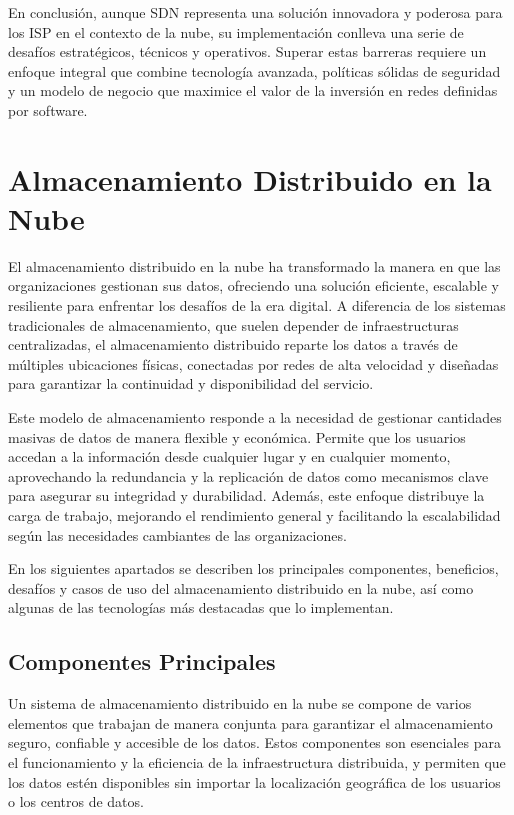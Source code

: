 {                En conclusión, aunque SDN representa una solución innovadora y poderosa para los ISP en el contexto de la nube, su implementación conlleva una serie de desafíos estratégicos, técnicos y operativos. Superar estas barreras requiere un enfoque integral que combine tecnología avanzada, políticas sólidas de seguridad y un modelo de negocio que maximice el valor de la inversión en redes definidas por software.
    
    \section{Almacenamiento Distribuido en la Nube}
    
        El almacenamiento distribuido en la nube ha transformado la manera en que las organizaciones gestionan sus datos, ofreciendo una solución eficiente, escalable y resiliente para enfrentar los desafíos de la era digital. A diferencia de los sistemas tradicionales de almacenamiento, que suelen depender de infraestructuras centralizadas, el almacenamiento distribuido reparte los datos a través de múltiples ubicaciones físicas, conectadas por redes de alta velocidad y diseñadas para garantizar la continuidad y disponibilidad del servicio.
        
        Este modelo de almacenamiento responde a la necesidad de gestionar cantidades masivas de datos de manera flexible y económica. Permite que los usuarios accedan a la información desde cualquier lugar y en cualquier momento, aprovechando la redundancia y la replicación de datos como mecanismos clave para asegurar su integridad y durabilidad. Además, este enfoque distribuye la carga de trabajo, mejorando el rendimiento general y facilitando la escalabilidad según las necesidades cambiantes de las organizaciones.
        
        En los siguientes apartados se describen los principales componentes, beneficios, desafíos y casos de uso del almacenamiento distribuido en la nube, así como algunas de las tecnologías más destacadas que lo implementan.
        
        \subsection{Componentes Principales}
        
            Un sistema de almacenamiento distribuido en la nube se compone de varios elementos que trabajan de manera conjunta para garantizar el almacenamiento seguro, confiable y accesible de los datos. Estos componentes son esenciales para el funcionamiento y la eficiencia de la infraestructura distribuida, y permiten que los datos estén disponibles sin importar la localización geográfica de los usuarios o los centros de datos.
            
}
